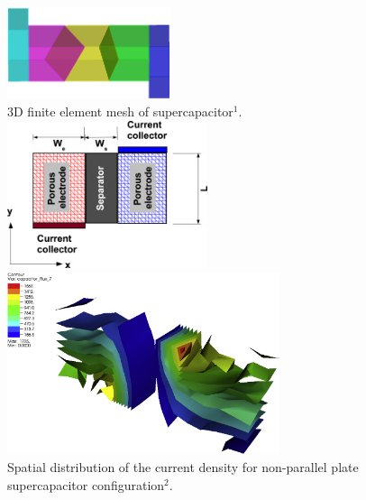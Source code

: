 \documentclass[8pt]{beamer}
\begin{document}
\begin{frame}
\begin{columns}
\begin{column}{.55\textwidth}
\begin{block}{}
\end{block}
\end{column}
\begin{column}{.42\textwidth}
\begin{center}
\begin{figure}[h]
    \centering
    \includegraphics[trim = 0in 0in 0in 0in, clip, width=0.45\textwidth]{figs_report/transparent.png} 
    \\{{\small 3D finite element mesh of supercapacitor$^1$.}}\\
    \includegraphics[trim = 0.2in 0.1in 0in 0in, clip, width=0.55\textwidth]{figs_report/nonplanar_supercap.jpg}
    \\
    \includegraphics[trim = 0in 0in 0in 0in, clip, width=0.75\textwidth]{figs_report/nonplanar_conf.png}
    \\ {{\small Spatial distribution of the current density for non-parallel plate supercapacitor configuration$^2$}.}
\end{figure}
\end{center}
\end{column}
\end{columns}


\end{frame}
\end{document}
